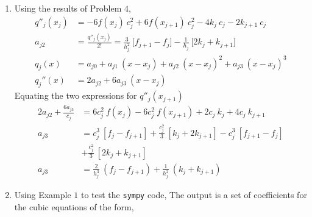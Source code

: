 \begin{enumerate}
    \item Using the results of Problem $ 4 $,
          \begin{align}
              q''_j(x_j) & = -6f(x_j)\ c_j^2 + 6f(x_{j+1})\ c_j^2 - 4k_j\ c_j
              - 2k_{j+1}\ c_j                                                 \\
              a_{j2}     & = \frac{q''_j(x_j)}{2!} = \frac{3}{h_j^2}\ \Big[
              f_{j+1} - f_j \Big] - \frac{1}{h_j}\ \Big[ 2k_j + k_{j+1} \Big] \\
              q_j(x)     & = a_{j0} + a_{j1}\ (x - x_j) + a_{j2}\ (x - x_j)^2
              + a_{j3}\ (x - x_j)^3                                           \\
              q_j''(x)   & = 2a_{j2} + 6a_{j3}\ (x - x_j)
          \end{align}
          Equating the two expressions for $ q''_j(x_{j+1}) $
          \begin{align}
              2a_{j2} + \frac{6a_{j3}}{c_j} & = 6c_j^2\ f(x_j) - 6c_j^2\ f(x_{j+1})
              + 2c_j\ k_j + 4c_j\ k_{j+1}                                           \\
              a_{j3}                        & = c_j^3\ [f_j - f_{j+1}]
              + \frac{c_j^2}{3}\ [k_j + 2k_{j+1}] - c_j^3\ [f_{j+1} - f_j]          \\
                                            & + \frac{c_j^2}{3}\ [2k_j + k_{j+1}]   \\
              a_{j3}                        & = \frac{2}{h_j^3}\ (f_j - f_{j+1})
              + \frac{1}{h_j^2}\ (k_j + k_{j+1})
          \end{align}

    \item Using Example $ 1 $ to test the \texttt{sympy} code,
          The output is a set of coefficients for the cubic equations of the form,
          \begin{figure}[H]
              \centering
          \end{figure}


\end{enumerate}
